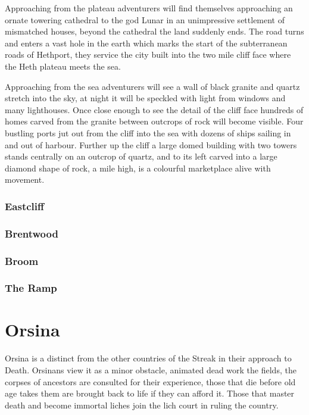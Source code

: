 \documentclass[10pt,twoside,twocolumn,openany,justified,bg=full,nomultitoc]{dndbook}
\begin{document}
\begin{commentbox}{}Approaching from the plateau adventurers will find themselves approaching an ornate towering cathedral to the god Lunar in an unimpressive settlement of mismatched houses, beyond the cathedral the land suddenly ends. The road turns and enters a vast hole in the earth which marks the start of the subterranean roads of Hethport, they service the city built into the two mile cliff face where the Heth plateau meets the sea. 

Approaching from the sea adventurers will see a wall of black granite and quartz stretch into the sky, at night it will be speckled with light from windows and many lighthouses. Once close enough to see the detail of the cliff face hundreds of homes carved from the granite between outcrops of rock will become visible. Four bustling ports jut out from the cliff into the sea with dozens of ships sailing in and out of harbour. Further up the cliff a large domed building with two towers stands centrally on an outcrop of quartz, and to its left carved into a large diamond shape of rock, a mile high, is a colourful marketplace alive with movement. 
\end{commentbox}

\subsection{Eastcliff}
\label{sec-2-3-3}
\subsection{Brentwood}
\label{sec-2-3-4}
\subsection{Broom}
\label{sec-2-3-5}
\subsection{The Ramp}
\label{sec-2-3-6}
\chapter{Orsina}
\label{sec-3}
Orsina is a distinct from the other countries of the Streak in their approach to Death. Orsinans view it as a minor obstacle, animated dead work the fields, the corpses of ancestors are consulted for their experience, those that die before old age takes them are brought back to life if they can afford it. Those that master death and become immortal liches join the lich court in ruling the country.\\
\end{document}
